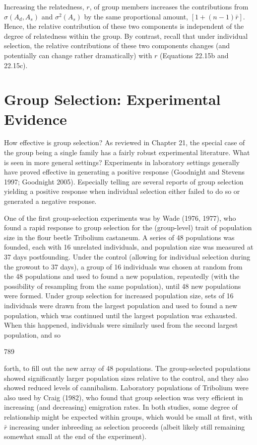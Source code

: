 \documentclass{article}
\begin{document}
Increasing the relatedness, $r$, of group members increases the contributions from $\sigma(A_d, A_s)$ and $\sigma^2(A_s)$ by the same proportional amount, $[1+(n-1)\bar{r}]$. Hence, the relative contribution of these two components is independent of the degree of relatedness within the group. By contrast, recall that under individual selection, the relative contributions of these two components changes (and potentially can change rather dramatically) with $r$ (Equations 22.15b and 22.15c).

\section{Group Selection: Experimental Evidence}
How effective is group selection? As reviewed in Chapter 21, the special case of the group being a single family has a fairly robust experimental literature. What is seen in more general settings? Experiments in laboratory settings generally have proved effective in generating a positive response (Goodnight and Stevens 1997; Goodnight 2005). Especially telling are several reports of group selection yielding a positive response when individual selection either failed to do so or generated a negative response.

One of the first group-selection experiments was by Wade (1976, 1977), who found a rapid response to group selection for the (group-level) trait of population size in the flour beetle Tribolium castaneum. A series of 48 populations was founded, each with 16 unrelated individuals, and population size was measured at 37 days postfounding. Under the control (allowing for individual selection during the growout to 37 days), a group of 16 individuals was chosen at random from the 48 populations and used to found a new population, repeatedly (with the possibility of resampling from the same population), until 48 new populations were formed. Under group selection for increased population size, sets of 16 individuals were drawn from the largest population and used to found a new population, which was continued until the largest population was exhausted. When this happened, individuals were similarly used from the second largest population, and so

789

forth, to fill out the new array of 48 populations. The group-selected populations showed significantly larger population sizes relative to the control, and they also showed reduced levels of cannibalism. Laboratory populations of Tribolium were also used by Craig (1982), who found that group selection was very efficient in increasing (and decreasing) emigration rates. In both studies, some degree of relationship might be expected within groups, which would be small at first, with  $ \bar{r} $ increasing under inbreeding as selection proceeds (albeit likely still remaining somewhat small at the end of the experiment).
\end{document}
